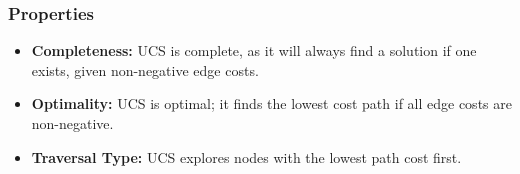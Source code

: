 \subsubsection*{Properties}
\begin{itemize}
    \item \textbf{Completeness:} UCS is complete, as it will always find a solution if one exists, given non-negative edge costs.
    \item \textbf{Optimality:} UCS is optimal; it finds the lowest cost path if all edge costs are non-negative.
    \item \textbf{Traversal Type:} UCS explores nodes with the lowest path cost first.
\end{itemize}